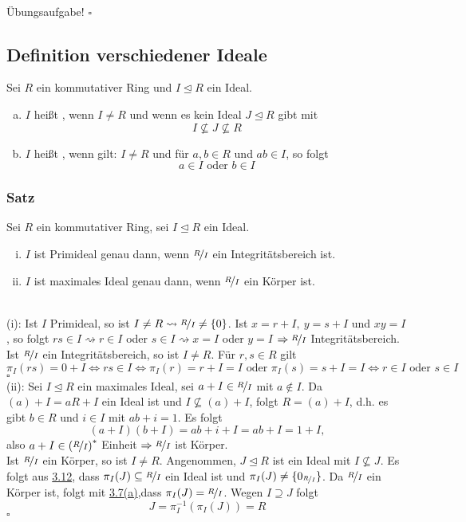 \\
Übungsaufgabe!
\hfill $\square$

\subsection{Definition verschiedener Ideale}
\label{sub:def_vers_ideale}
Sei $R$ ein kommutativer Ring und $I\trianglelefteq R$ ein Ideal.
\begin{enumerate}[(a)]
	\item $I$ heißt , wenn $I\neq R$ und wenn es kein Ideal $J\trianglelefteq R$ gibt mit
	\[
	I\nsubseteq J\nsubseteq R
	\]
	\item $I$ heißt , wenn gilt:
	$I\neq R$ und für $a,b\in R$ und $ab\in I$, so folgt
	\[
	a\in I \text{ oder } b\in I
	\]
\end{enumerate}

\subsubsection*{Satz}
Sei $R$ ein kommutativer Ring, sei $I\trianglelefteq R$ ein Ideal.
\begin{enumerate}[(i)]
	\item $I$ ist Primideal genau dann, wenn $\nicefrac{R}{I}$ ein Integritätsbereich ist.
	\item $I$ ist maximales Ideal genau dann, wenn $\nicefrac{R}{I}$ ein Körper ist.
\end{enumerate}

\\
(i): Ist $I$ Primideal, so ist $I\neq R\rightsquigarrow \nicefrac{R}{I}\neq \{0\}$.
Ist $x=r+I,~y=s+I$ und $xy=I$, so folgt $rs\in I\rightsquigarrow r\in I$ oder $s\in I\rightsquigarrow x=I$ oder $y=I$ $\Rightarrow \nicefrac{R}{I}$ Integritätsbereich.\\
Ist $\nicefrac{R}{I}$ ein Integritätsbereich, so ist $I\neq R$.
Für $r,s\in R$ gilt 
\[
\pi_I(rs)=0+I\Leftrightarrow rs\in I \Leftrightarrow\pi_I(r)=r+I=I \text{ oder } \pi_I(s)=s+I=I \Leftrightarrow r\in I \text{ oder } s\in I
\]
\hfill $\square$\\

(ii): Sei $I\trianglelefteq R$ ein maximales Ideal, sei $a+I\in \nicefrac{R}{I}$ mit $a\notin I$.
Da $(a)+I=aR+I$ ein Ideal ist und $I\nsubseteq (a)+I$, folgt $R=(a)+I$, d.h. es gibt $b\in R$ und $i\in I$ mit $ab+i=1$.
Es folgt 
\[
(a+I)(b+I)=ab+i+I=ab+I=1+I,
\]
also $a+I\in\left( \nicefrac{R}{I}\right)^*$ Einheit $\Rightarrow \nicefrac{R}{I}$ ist Körper.\\
Ist $\nicefrac{R}{I}$ ein Körper, so ist $I\neq R$.
Angenommen, $J\trianglelefteq R$ ist ein Ideal mit $I\nsubseteq J$.
Es folgt aus \hyperref[sub:satz_13]{3.12}, dass $\pi_I(J)\subseteq \nicefrac{R}{I}$ ein Ideal ist und $\pi_I(J)\neq \{0_{\nicefrac{R}{I}}\}$.
Da $\nicefrac{R}{I}$ ein Körper ist, folgt mit \hyperref[sub:bsp_ideale]{3.7(a)},dass $\pi_I(J)=\nicefrac{R}{I}$.
Wegen $I\supseteq J$ folgt
\[
J=\pi_I^{-1}(\pi_I(J))=R
\]
\hfill $\square$


